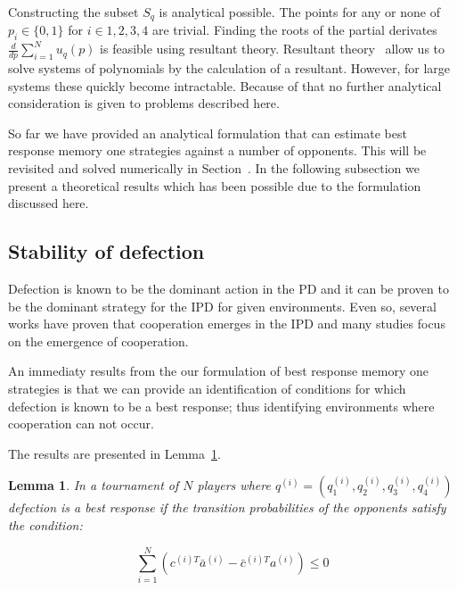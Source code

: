\documentclass[10pt]{article}
\newtheorem{lemma}[theorem]{Lemma}
\begin{document}
Constructing the subset \(S_q\) is analytical possible. The points for any or
none of \(p_i \in \{0, 1\}\) for \(i \in {1, 2, 3, 4}\) are trivial. Finding the
roots of the partial derivates \(\frac{d}{dp} \sum\limits_{i=1} ^ N  u_q(p)\)
is feasible using resultant theory. Resultant theory~\cite{Jonsson2005} allow
us to solve systems of polynomials by the calculation of a resultant.
However, for large systems these quickly become intractable. Because of that no
further analytical consideration is given to problems described here.

So far we have provided an analytical formulation that can estimate best response
memory one strategies against a number of opponents. This
will be revisited and solved numerically in Section~\cite{section:numerical_experiments}.
In the following subsection we present a theoretical results which has been
possible due to the formulation discussed here.

\subsection{Stability of defection}

Defection is known to be the dominant action in the PD and it can be proven to
be the dominant strategy for the IPD for given environments. Even so, several
works have proven that cooperation emerges in the IPD and many studies focus on
the emergence of cooperation. 

An immediaty results from the our formulation of best response memory one strategies
is that we can provide an identification of
conditions for which defection is known to be a best response; thus identifying
environments where cooperation can not occur.

The results are presented in Lemma~\ref{lemma:stability_of_defection}.

\begin{lemma}\label{lemma:stability_of_defection}
    In a tournament of \(N\) players where \(q^{(i)} = (q_{1}^{(i)}, q_{2}^{(i)}, q_{3}^{(i)}, q_{4}^{(i)})\)
    defection is a best response if the transition probabilities of the
    opponents satisfy the condition:

    \begin{equation}
        \sum_{i=1} ^ N (c^{(i)T} \bar{a}^{(i)} - \bar{c}^{(i)T} a^{(i)}) \leq 0
    \end{equation}
\end{lemma}
\end{document}
